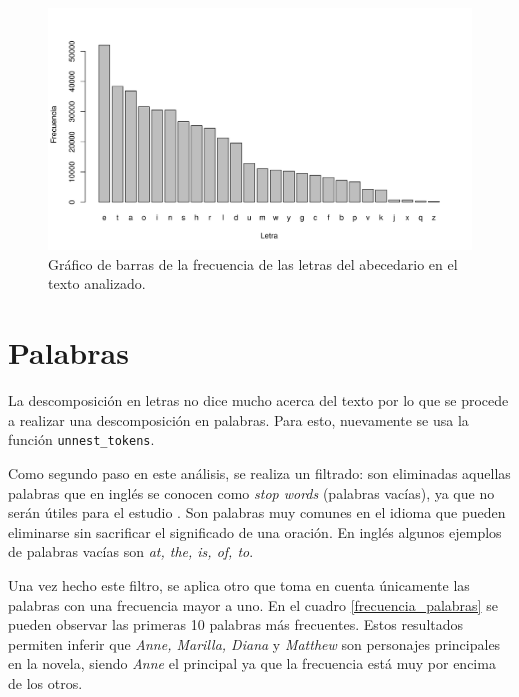 \documentclass[12pt]{article}
\begin{document}
	
	\begin{figure}
		\centering
		\includegraphics[scale=0.7]{letras_decreciente.png}
		\caption{Gráfico de barras de la frecuencia de las letras del abecedario en el texto analizado.}
		\label{letras}
	\end{figure}

	\section{Palabras}
	
	La descomposición en letras no dice mucho acerca del texto por lo que se procede a realizar una descomposición en palabras. Para esto, nuevamente se usa la función \texttt{unnest\_tokens}.
	
	Como segundo paso en este análisis, se realiza un filtrado: son eliminadas aquellas palabras que en inglés se conocen como \textit{stop words} (palabras vacías), ya que no serán útiles para el estudio \cite{textMining}. Son palabras muy comunes en el idioma que pueden eliminarse sin sacrificar el significado de una oración. En inglés algunos ejemplos de palabras vacías son \textit{at, the, is, of, to}.
	
	Una vez hecho este filtro, se aplica otro que toma en cuenta únicamente las palabras con una frecuencia mayor a uno. En el cuadro \ref{frecuencia_palabras} se pueden observar las primeras 10 palabras más frecuentes. Estos resultados permiten inferir que \textit{Anne, Marilla, Diana} y \textit{Matthew} son personajes principales en la novela, siendo \textit{Anne} el principal ya que la frecuencia está muy por encima de los otros.
	
\end{document}
